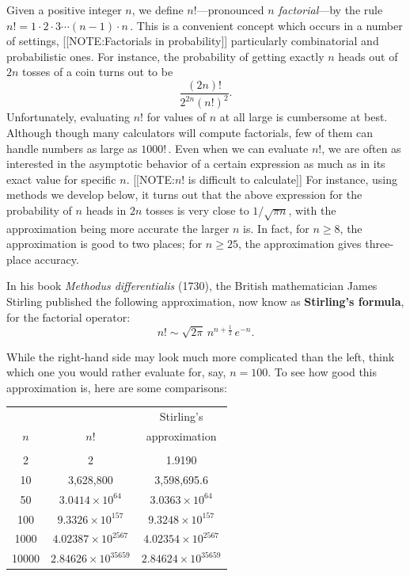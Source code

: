 Given a positive integer $n$, we define $n!$---pronounced {\em $n$
  factorial}---by the rule $n!=1\cdot 2\cdot 3\cdots (n-1)\cdot n$\,.
This is a convenient concept which occurs in a number of settings,
[[NOTE:Factorials  in probability]]	
particularly combinatorial and probabilistic ones.  For instance, the
probability of getting exactly $n$ heads out of
$2n$ tosses of a coin turns out to be
	\[
\dfrac{(2n)!}{2^{2n}(n!)^2}.
\] 
Unfortunately, evaluating $n!$ for values of $n$ at all large is
cumbersome at best.  Although though many calculators will compute
factorials, few of them can handle numbers as large as $1000!$\,.
Even when we can evaluate $n!$, we are often as interested in the
asymptotic behavior of a certain expression as much as in its exact
value for specific $n$.
[[NOTE:$n!$ is difficult  to calculate]]
For instance, using methods we develop below, it turns out that the
above expression for the probability of $n$ heads in $2n$ tosses is
very close to $1/\sqrt{\pi n}$, with the approximation being more
accurate the larger $n$ is.  In fact, for $n \geq 8$, the
approximation is good to two places; for $n \geq 25$, the
approximation gives three-place accuracy.

In his book {\em Methodus differentialis\/} (1730), the British
mathematician James Stirling published the
following approximation, now know as {\bf Stirling's formula}, for the
factorial operator:
\[
n!\sim \sqrt{2\pi}\,n^{n+\frac{1}{2}}\,e^{-n}.
\]

While the right-hand side may look much more complicated than the
left, think which one you would rather evaluate for, say, $n=100$. To
see how good this approximation is, here are some comparisons:
\begin{center}


\begin{tabular}{ccc}\label{table2}
&&Stirling's \\
$n$&$n!$&approximation \\ [2pt]
\hline\\[-10pt]
2&2&1.9190   \\
10 & 3,628,800   & 3,598,695.6\\
50 & $3.0414\times 10^{64}$   & $3.0363\times 10^{64}$\\
100 & $9.3326\times 10^{157}$   & $9.3248\times 10^{157}$\\
1000 & $4.02387\times 10^{2567}$   & $4.02354\times 10^{2567}$\\
10000& $2.84626\times 10^{35659}$ & $2.84624\times 10^{35659}$ \\
\end{tabular}
\end{center}

